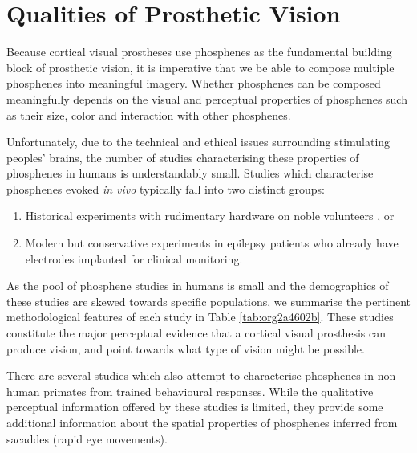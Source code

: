 \documentclass[a4paper,11pt,openany]{book}
\begin{document}
\chapter{Qualities of Prosthetic Vision}
\label{sec:org94dc068}
\label{org0f0024e}

Because cortical visual prostheses use phosphenes as the fundamental building block of prosthetic vision, it is imperative that we be able to compose multiple phosphenes into meaningful imagery.
Whether phosphenes can be composed meaningfully depends on the visual and perceptual properties of phosphenes such as their size, color and interaction with other phosphenes.

Unfortunately, due to the technical and ethical issues surrounding stimulating peoples' brains, the number of studies characterising these properties of phosphenes in humans is understandably small.
Studies which characterise phosphenes evoked \emph{in vivo} typically fall into two distinct groups:

\begin{enumerate}
\item Historical experiments with rudimentary hardware on noble volunteers \cite{brindley_sensations_1968,dobelle_artificial_1974,bak_visual_1990}, or
\item Modern but conservative experiments in epilepsy patients who already have electrodes implanted for clinical monitoring. \cite{lee_mapping_2000,winawer_linking_2016,murphey_perceiving_2009,bosking_electrical_2017,collins_preserved_2019}
\end{enumerate}

As the pool of phosphene studies in humans is small and the demographics of these studies are skewed towards specific populations, we summarise the pertinent methodological features of each study in Table \ref{tab:org2a4602b}.
These studies constitute the major perceptual evidence that a cortical visual prosthesis can produce vision, and point towards what type of vision might be possible.

There are several studies which also attempt to characterise phosphenes in non-human primates from trained behavioural responses. \cite{tehovnik_phosphene_2005,tehovnik_phosphene_2007,tehovnik_microstimulation_2007,tehovnik_microstimulation_2009}
While the qualitative perceptual information offered by these studies is limited, they provide some additional information about the spatial properties of phosphenes inferred from sacaddes (rapid eye movements).
\end{document}
